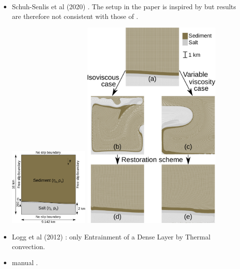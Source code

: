 \begin{itemize}
\item Schuh-Senlis et al (2020) \cite{sctc20}. The setup in the paper is inspired 
by \cite{vaks97} but results are therefore not consistent with those of \cite{vaks97}.

\begin{center}
\includegraphics[width=4cm]{images/benchmark_vaks97/schuh_senlis_etal/fig04}
\includegraphics[width=7cm]{images/benchmark_vaks97/schuh_senlis_etal/fig05}
\end{center}



\item Logg et al (2012) \cite{lomw12}: only Entrainment of a Dense Layer by Thermal convection.

\newpage
\item \aspect{} manual \cite{aspectmanual}.


\end{itemize}
